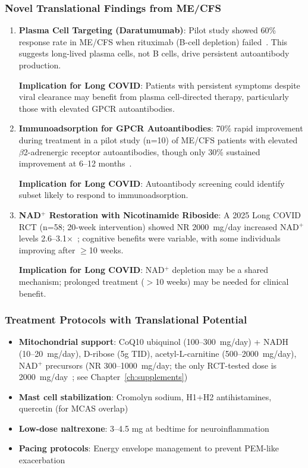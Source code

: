 \subsubsection{Novel Translational Findings from ME/CFS}

\begin{enumerate}
    \item \textbf{Plasma Cell Targeting (Daratumumab)}: Pilot study showed 60\% response rate in ME/CFS when rituximab (B-cell depletion) failed~\cite{Fluge2025daratumumab}. This suggests long-lived plasma cells, not B cells, drive persistent autoantibody production.

    \textbf{Implication for Long COVID}: Patients with persistent symptoms despite viral clearance may benefit from plasma cell-directed therapy, particularly those with elevated GPCR autoantibodies.

    \item \textbf{Immunoadsorption for GPCR Autoantibodies}: 70\% rapid improvement during treatment in a pilot study (n=10) of ME/CFS patients with elevated $\beta$2-adrenergic receptor autoantibodies, though only 30\% sustained improvement at 6--12 months~\cite{Scheibenbogen2018immunoadsorption}.

    \textbf{Implication for Long COVID}: Autoantibody screening could identify subset likely to respond to immunoadsorption.

    \item \textbf{NAD$^+$ Restoration with Nicotinamide Riboside}: A 2025 Long COVID RCT (n=58; 20-week intervention) showed NR 2000~mg/day increased NAD$^+$ levels 2.6--3.1$\times$~\cite{Wu2025NRLongCOVID}; cognitive benefits were variable, with some individuals improving after $\geq$10 weeks.

    \textbf{Implication for Long COVID}: NAD$^+$ depletion may be a shared mechanism; prolonged treatment ($>$10 weeks) may be needed for clinical benefit.
\end{enumerate}

\subsubsection{Treatment Protocols with Translational Potential}

\begin{itemize}
    \item \textbf{Mitochondrial support}: CoQ10 ubiquinol (100--300~mg/day) + NADH (10--20~mg/day), D-ribose (5g TID), acetyl-L-carnitine (500--2000~mg/day), NAD$^+$ precursors (NR 300--1000~mg/day; the only RCT-tested dose is 2000~mg/day~\cite{Wu2025NRLongCOVID}; see Chapter~\ref{ch:supplements})
    \item \textbf{Mast cell stabilization}: Cromolyn sodium, H1+H2 antihistamines, quercetin (for MCAS overlap)
    \item \textbf{Low-dose naltrexone}: 3--4.5 mg at bedtime for neuroinflammation
    \item \textbf{Pacing protocols}: Energy envelope management to prevent PEM-like exacerbation
\end{itemize}


